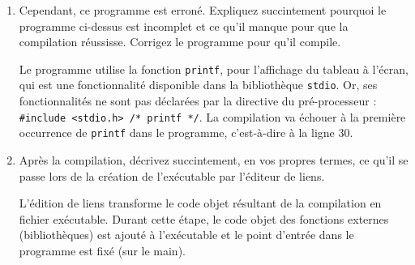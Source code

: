 \begin{enumerate}
\item Cependant, ce programme est erroné. Expliquez succintement pourquoi le programme ci-dessus est incomplet et ce
  qu'il manque pour que la compilation réussisse. Corrigez le programme pour qu'il compile.
\begin{correction}
  Le programme utilise la fonction \verb|printf|, pour l'affichage du tableau à l'écran, qui est une fonctionnalité disponible dans la bibliothèque \verb|stdio|. Or, ses fonctionnalités ne sont pas déclarées par la directive du pré-processeur : \verb|#include <stdio.h> /* printf */|. La compilation va échouer à la première occurrence de \verb|printf| dans le programme, c'est-à-dire à la ligne 30.
\end{correction}
\item Après la compilation, décrivez succintement, en vos propres termes, ce qu'il se passe lors de la création de l'exécutable par l'éditeur de liens.

  \begin{correction}
    L'édition de liens transforme le code objet résultant de la
    compilation en fichier exécutable. Durant cette étape, le code
    objet des fonctions externes (bibliothèques) est ajouté à
    l'exécutable et le point d'entrée dans le programme est fixé (sur
    le main).
  \end{correction}


\end{enumerate}
